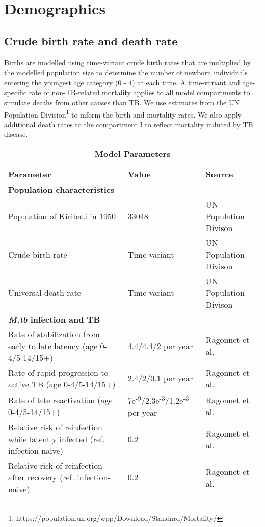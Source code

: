 

\section{Demographics}
\subsection{Crude birth rate and death rate}
Births are modelled using time-variant crude birth rates that are multiplied by the modelled population 
size to determine the number of newborn individuals entering the youngest age category (0 - 4) at each time. A time-variant 
and age-specific rate of non-TB-related mortality applies to all model compartments to simulate 
deaths from other causes than TB. We use estimates from the UN Population Division\footnote{https://population.un.org/wpp/Download/Standard/Mortality/} to inform the 
birth and mortality rates.
We also apply additional death rates to the compartment I to reflect mortality induced by TB 
disease.
\begin{table}[!htp]
    \caption{\textbf{Model Parameters}}
    \label{tab:parameter}
    \begin{threeparttable}
    \begin{tabularx}{\textwidth}{ X  X  X }
        \hline
        \textbf{Parameter} & \textbf{Value} & \textbf{Source} \\
        \hline
        \textbf{Population characteristics} & & \\
        Population of Kiribati in 1950 & 33048 & UN Population Divison \\
        Crude birth rate  & Time-variant & UN Population Divison \\
        Universal death rate & Time-variant & UN Population Divison \\
        \hline
        \textbf{\emph{M.tb} infection and TB} \\
        Rate of stabilization from early to late latency (age 0-4/5-14/15+) & 4.4/4.4/2 per year & Ragonnet et al.\cite{ragonnet-2022} \\
        Rate of rapid progression to active TB (age 0-4/5-14/15+) & 2.4/2/0.1 per year & Ragonnet et al.\cite{ragonnet-2022} \\
        Rate of late reactivation (age 0-4/5-14/15+) & 7e\textsuperscript{-9}/2.3e\textsuperscript{-3}/1.2e\textsuperscript{-3} per year & Ragonnet et al.\cite{ragonnet-2022} \\
        Relative risk of reinfection while latently infected (ref. infection-naive) & 0.2 & Ragonnet et al.\cite{ragonnet-2022} \\
        Relative risk of reinfection after recovery (ref. infection-naive) & 0.2 & Ragonnet et al.\cite{ragonnet-2022} \\
        \hline
	\end{tabularx}
    \end{threeparttable}
\end{table}
